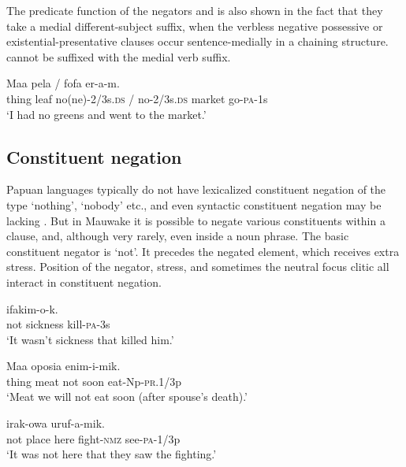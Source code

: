 The predicate function of the negators  and  is also shown in the fact that they take a medial different-subject suffix, when the verbless negative possessive or existential-presentative clauses occur sentence-medially in a chaining structure.  cannot be suffixed with the medial verb suffix.

\ea%
\label{ex:x1101}
\gll Maa  pela    /    fofa  er-a-m. \\
thing  leaf  no(ne)-2/3s.\textsc{ds}  /  no-2/3s.\textsc{ds}  market  go-\textsc{pa}-1s\\
\glt `I had no greens and went to the market.'
\z

\subsection{Constituent negation}
{}
Papuan languages typically do not have lexicalized constituent negation of the type `nothing', `nobody' etc., and even syntactic constituent negation may be lacking \citep[271--272]{Reesink1987}. But in Mauwake it is possible to negate various constituents within a clause, and, although very rarely, even inside a noun phrase. The basic constituent negator is  `not'. It precedes the negated element, which receives extra stress. Position of the negator, stress, and sometimes the neutral focus clitic all interact in constituent negation.

\ea%
\label{ex:x1102}
\gll {}    ifakim-o-k. \\
not  sickness  kill-\textsc{pa}-3s\\
\glt `It wasn't sickness that killed him.'
\z

\ea%
\label{ex:x1103}
\gll Maa  oposia      enim-i-mik. \\
thing  meat  not  soon  eat-Np-\textsc{pr}.1/3p\\
\glt `Meat we will not eat soon (after spouse's death).'
\z

\ea%
\label{ex:x1108}
\gll {}      irak-owa  uruf-a-mik. \\
not  place  here  fight-\textsc{nmz}  see-\textsc{pa}-1/3p\\
\glt `It was not here that they saw the fighting.'
\z

